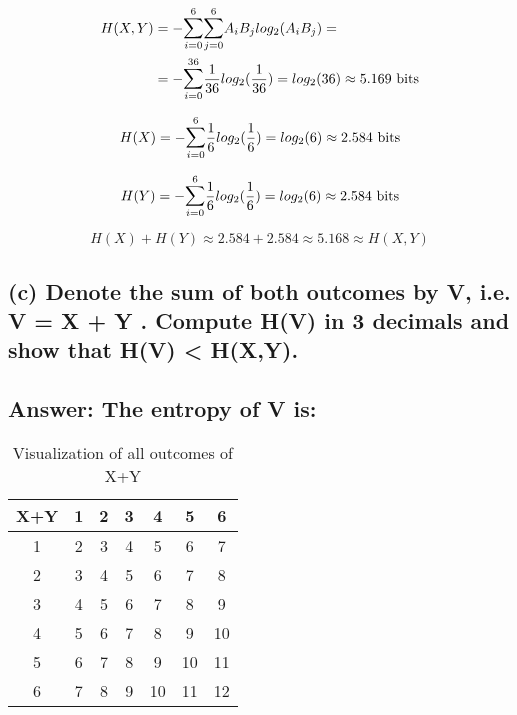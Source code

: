 \documentclass[15px]{article}
\begin{document}
\begin{equation}
\begin{split}
H(X,Y) & = -\mathlarger{\sum}_{i=0}^{6}\mathlarger{\sum}_{j=0}^{6} A_iB_jlog_2(A_iB_j) = \\
& = -\mathlarger{\sum}_{i=0}^{36} \frac{1}{36}log_2(\frac{1}{36}) = log_2(36) \approx 5.169 \text{ bits}
\end{split}
\end{equation}

\begin{equation}
H(X) = -\mathlarger{\sum}_{i=0}^{6} \frac{1}{6}log_2(\frac{1}{6}) = log_2(6) \approx 2.584 \text{ bits}
\end{equation}

\begin{equation}
H(Y) = -\mathlarger{\sum}_{i=0}^{6} \frac{1}{6}log_2(\frac{1}{6}) = log_2(6) \approx 2.584 \text{ bits}
\end{equation}

\begin{equation}
H(X) + H(Y) \approx 2.584 + 2.584 \approx 5.168 \approx H(X,Y)
\end{equation}

\subsection*{\normalfont (c) Denote the sum of both outcomes by V, i.e. V = X + Y . Compute H(V) in 3 decimals and show that H(V) < H(X,Y).}

\subsection*{ Answer: The entropy of V is:}

\begin{table}[t]
\centering
\begin{adjustbox}{width=0.5\linewidth}
\begin{tabular}{|c|c|c|c|c|c|c|}
\hline
X+Y & 1 & 2 & 3 & 4 & 5 & 6 \\ \hline
1 & 2 & 3 & 4 & 5 & 6 & 7 \\ \hline
2 & 3 & 4 & 5 & 6 & 7 & 8 \\ \hline
3 & 4 & 5 & 6 & 7 & 8 & 9\\ \hline
4 & 5 & 6 & 7 & 8 & 9 & 10\\ \hline
5 & 6 & 7 & 8 & 9 & 10 & 11\\ \hline
6 & 7 & 8 & 9 & 10 & 11 & 12\\ \hline
\end{tabular}
\end{adjustbox}
\caption{Visualization of all outcomes of X+Y} 
\end{table}
\end{document}
